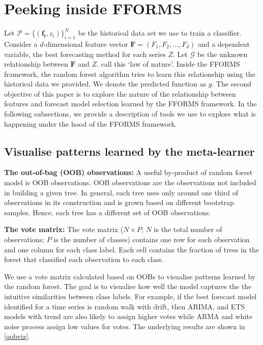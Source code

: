 \documentclass[11pt,a4paper,]{article}
\begin{document}
\hypertarget{peeking}{%
\section{Peeking inside FFORMS}\label{peeking}}

Let \(\mathcal{P}=\{(\mathbf{f_i}, z_i)\}_{i=1}^{N}\) be the
historical data set we use to train a classifier. Consider a
\(d\)-dimensional feature vector \(\mathbf{F}=(F_1, F_2, ..., F_d)\) and a dependent
variable, the best forecasting method for each series \(Z\). Let \(\mathcal{G}\) be the unknown relationship between \(\mathbf{F}\) and
\(Z\). \textcite{Zhao} call this `law of nature'. Inside the FFORMS framework, the random forest algorithm tries to learn this relationship using
the historical data we provided. We denote the predicted function as
\(g\). The second objective of this paper is to explore the nature of the relationship between features and forecast model selection learned by the FFORMS framework. In the following subsections, we provide a description of tools we use to explore what is happening under the hood of the FFORMS framework.

\hypertarget{visualise-patterns-learned-by-the-meta-learner}{%
\subsection{Visualise patterns learned by the meta-learner}\label{visualise-patterns-learned-by-the-meta-learner}}

\textbf{The out-of-bag (OOB) observations:} A useful by-product of random forest model is OOB observations. OOB observations are the observations not included in building a given tree. In general, each tree uses only around one third of observations in its construction and is grown based on different bootstrap samples. Hence, each tree has a different set of OOB observations.

\textbf{The vote matrix:} The vote matrix (\(N \times P\); \(N\) is the total number of observations; \(P\) is the number of classes) contains one row for each observation and one column for each class label. Each cell contains the fraction of trees in the forest that classified each observation to each class.

We use a vote matrix calculated based on OOBs to visualise patterns learned by the random forest. The goal is to visualise how well the model captures the the intuitive similarities between class labels. For example, if the best forecast model identified for a time series is random walk with drift, then ARIMA, and ETS models with trend are also likely to assign higher votes while ARMA and white noise process assign low values for votes. The underlying results are shown in \autoref{oobviz}.
\end{document}

